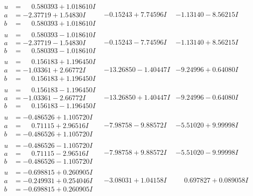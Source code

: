 \documentclass[1p]{elsarticle_modified}
\theoremstyle{definition}
\begin{document}
$$\begin{array}{c|c|c}
\begin{aligned}
u &= \phantom{-}0.580393 + 1.018610 I \\
a &= -2.37719 + 1.54830 I \\
b &= \phantom{-}0.580393 + 1.018610 I\end{aligned}
 & -0.15243 + 7.74596 I & -1.13140 - 8.56215 I \\ \hline\begin{aligned}
u &= \phantom{-}0.580393 - 1.018610 I \\
a &= -2.37719 - 1.54830 I \\
b &= \phantom{-}0.580393 - 1.018610 I\end{aligned}
 & -0.15243 - 7.74596 I & -1.13140 + 8.56215 I \\ \hline\begin{aligned}
u &= \phantom{-}0.156183 + 1.196450 I \\
a &= -1.03361 + 2.66772 I \\
b &= \phantom{-}0.156183 + 1.196450 I\end{aligned}
 & -13.26850 - 1.40447 I & -9.24996 + 0.64080 I \\ \hline\begin{aligned}
u &= \phantom{-}0.156183 - 1.196450 I \\
a &= -1.03361 - 2.66772 I \\
b &= \phantom{-}0.156183 - 1.196450 I\end{aligned}
 & -13.26850 + 1.40447 I & -9.24996 - 0.64080 I \\ \hline\begin{aligned}
u &= -0.486526 + 1.105720 I \\
a &= \phantom{-}0.71115 + 2.96516 I \\
b &= -0.486526 + 1.105720 I\end{aligned}
 & -7.98758 - 9.88572 I & -5.51020 + 9.99998 I \\ \hline\begin{aligned}
u &= -0.486526 - 1.105720 I \\
a &= \phantom{-}0.71115 - 2.96516 I \\
b &= -0.486526 - 1.105720 I\end{aligned}
 & -7.98758 + 9.88572 I & -5.51020 - 9.99998 I \\ \hline\begin{aligned}
u &= -0.698815 + 0.260905 I \\
a &= -0.249931 + 0.254046 I \\
b &= -0.698815 + 0.260905 I\end{aligned}
 & -3.08031 + 1.04158 I & \phantom{-}0.697827 + 0.089058 I \\ \hline\begin{aligned}

\end{aligned}
\end{array}$$
\end{document}
